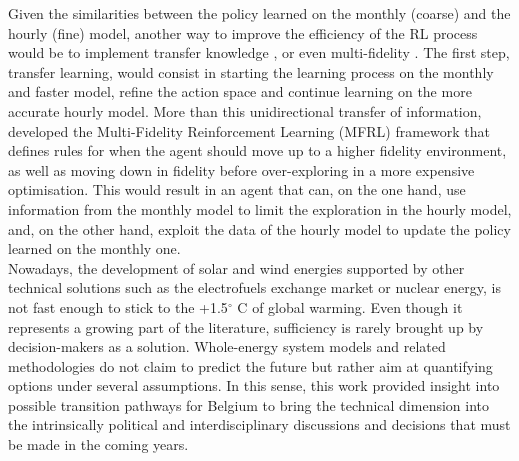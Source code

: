 Given the similarities between the policy learned on the monthly (coarse) and the hourly (fine) model, another way to improve the efficiency of the \gls{RL} process would be to implement transfer knowledge \cite{mann2013directed}, or even multi-fidelity \cite{cutler2014reinforcement}.  The first step, transfer learning, would consist in starting the learning process on the monthly and faster model, refine the action space and continue learning on the more accurate hourly model.  More than this unidirectional transfer of information, \citet{cutler2014reinforcement} developed the Multi-Fidelity Reinforcement Learning (MFRL) framework that defines rules for when the agent should move up to a higher fidelity environment, as well as moving down in fidelity before over-exploring in a more expensive optimisation.  This would result in an agent that can, on the one hand, use information from the monthly model to limit the exploration in the hourly model, and, on the other hand, exploit the data of the hourly model to update the policy learned on the monthly one.\\

Nowadays, the development of solar and wind energies supported by other technical solutions such as the electrofuels exchange market or nuclear energy, is not fast enough to stick to the +1.5$^{\circ}$ C of global warming. Even though it represents a growing part of the literature, sufficiency is rarely brought up by decision-makers as a solution. Whole-energy system models and related methodologies do not claim to predict the future but rather aim at quantifying options under several assumptions. In this sense, this work provided insight into possible transition pathways for Belgium to bring the technical dimension into the intrinsically political and interdisciplinary discussions and decisions that must be made in the coming years.